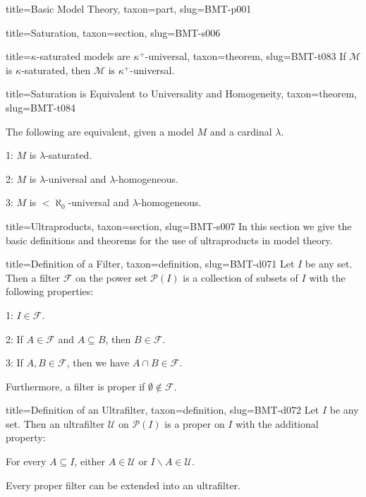 \documentclass[a4paper]{article}
\begin{document}
\begin{tree}{title={Basic Model Theory}, taxon={part}, slug={BMT-p001}}
\begin{tree}{title={Saturation}, taxon={section}, slug={BMT-s006}}
\begin{tree}{title={\(\kappa\)-saturated models are \(\kappa ^+\)-universal}, taxon={theorem}, slug={BMT-t083}}
If \(\mathcal {M}\) is \(\kappa\)-saturated, then \(\mathcal {M}\) is \(\kappa ^+\)-universal.
\end{tree}

\begin{tree}{title={Saturation is Equivalent to Universality and Homogeneity}, taxon={theorem}, slug={BMT-t084}}

    The following are equivalent, given a model \(M\) and a cardinal \(\lambda\).
\par{
    1: \(M\) is \(\lambda\)-saturated.
}\par{
    2: \(M\) is \(\lambda\)-universal and \(\lambda\)-homogeneous.
}\par{
    3: \(M\) is \(< \aleph _0\)-universal and \(\lambda\)-homogeneous.
}
\end{tree}

\end{tree}


  
  
\begin{tree}{title={Ultraproducts}, taxon={section}, slug={BMT-s007}}
In this section we give the basic definitions and theorems for the use of ultraproducts in model theory.
\begin{tree}{title={Definition of a Filter}, taxon={definition}, slug={BMT-d071}}
Let \(I\) be any set. Then a filter \(\mathcal {F}\) on the power set \(\mathcal {P}(I)\) is a collection of subsets of \(I\) with the following properties:\par{1: \(I \in \mathcal {F}\).}\par{2: If \(A \in   \mathcal {F}\) and \(A \subseteq  B\), then \(B \in   \mathcal {F}\).}\par{3: If \(A,B  \in   \mathcal {F}\), then we have \(A \cap  B \in   \mathcal {F}\).}\par{Furthermore, a filter is proper if \(\emptyset \notin \mathcal {F}\).}
\end{tree}

\begin{tree}{title={Definition of an Ultrafilter}, taxon={definition}, slug={BMT-d072}}
Let \(I\) be any set. Then an ultrafilter \(\mathcal {U}\) on \(\mathcal {P}(I)\) is a proper  on \(I\) with the additional property:\par{For every \(A \subseteq  I\), either \(A \in \mathcal {U}\) or \(I \backslash  A \in \mathcal {U}\).}\par{Every proper filter can be extended into an ultrafilter.}
\end{tree}


\end{tree}
\end{tree}
\end{document}
